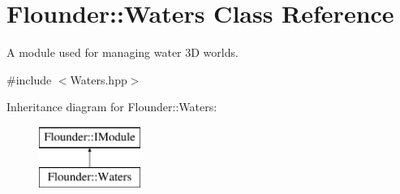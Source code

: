 \hypertarget{class_flounder_1_1_waters}{}\section{Flounder\+:\+:Waters Class Reference}
\label{class_flounder_1_1_waters}


A module used for managing water 3D worlds.  




{\ttfamily \#include $<$Waters.\+hpp$>$}

Inheritance diagram for Flounder\+:\+:Waters\+:\begin{figure}[H]
\begin{center}
\leavevmode
\includegraphics[height=2.000000cm]{class_flounder_1_1_waters}
\end{center}
\end{figure}
